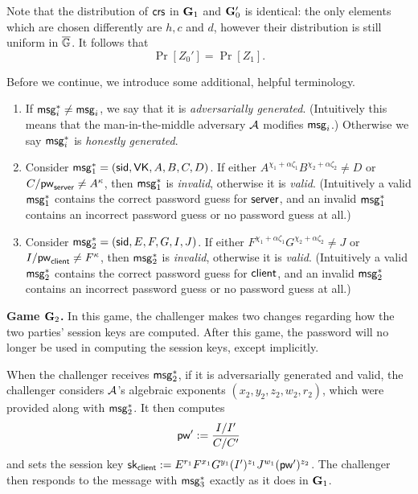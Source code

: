 Note that the distribution of $\mathsf{crs}$ in $\mathbf{G}_1$ and $\mathbf{G}_0'$ is identical: the only elements which are chosen differently are $h, c$ and $d$, however their distribution is still uniform in $\overline{\mathbb{G}}$. It follows that $$\Pr[Z_0'] = \Pr[Z_1].$$

Before we continue, we introduce some additional, helpful terminology. 

\begin{enumerate}
	\item If $\mathsf{msg}_{i}^{*}\neq\mathsf{msg}_{i}$, we say that it is \textit{adversarially generated}. (Intuitively this means that the man-in-the-middle adversary $\mathcal{A}$ modifies $\mathsf{msg}_{i}$.) Otherwise we say $\mathsf{msg}_{i}^*$ is \emph{honestly generated}.
	\item Consider $\mathsf{msg}_{1}^{*} = (\mathsf{sid},\mathsf{VK},A,B,C,D)$. If either $A^{\chi_1+\alpha\zeta_1}B^{\chi_2+\alpha\zeta_2}\neq D$ or $C/\mathsf{pw}_{\mathsf{server}}\neq A^\kappa$, then $\mathsf{msg}_{1}^*$ is \textit{invalid}, otherwise it is \textit{valid}. (Intuitively a valid $\mathsf{msg}_{1}^*$ contains the correct password guess for $\mathsf{server}$, and an invalid $\mathsf{msg}_{1}^*$ contains an incorrect password guess or no password guess at all.)
	\item Consider $\mathsf{msg}_{2}^{*} = (\mathsf{sid},E,F,G,I,J)$. If either $F^{\chi_1+\alpha\zeta_1}G^{\chi_2+\alpha\zeta_2}\neq J$ or $I/\mathsf{pw}_{\mathsf{client}}\neq F^\kappa$, then $\mathsf{msg}_{2}^*$ is \textit{invalid}, otherwise it is \textit{valid}. (Intuitively a valid $\mathsf{msg}_{2}^*$ contains the correct password guess for $\mathsf{client}$, and an invalid $\mathsf{msg}_{2}^*$ contains an incorrect password guess or no password guess at all.)
\end{enumerate}

\textbf{Game $\mathbf{G}_2$.} In this game, the challenger makes two changes regarding how the two parties' session keys are computed. After this game, the password will no longer be used in computing the session keys, except implicitly.

When the challenger receives $\mathsf{msg}_{2}^{*}$, if it is adversarially generated and valid, the challenger considers $\mathcal{A}$'s algebraic exponents $(x_2,y_2,z_2,w_2,r_2)$, which were provided along with $\mathsf{msg}_{2}^{*}$.  It then computes $$\mathsf{pw}':=\frac{I/I'}{C/C'}$$ and sets the session key $\mathsf{sk}_{\mathsf{client}} := E^{r_1}F^{x_1}G^{y_1}(I')^{z_1}J^{w_1}(\mathsf{pw}')^{z_2}$. The challenger then responds to the message with $\mathsf{msg}_{3}^{*}$ exactly as it does in $\mathbf{G}_1$.  

